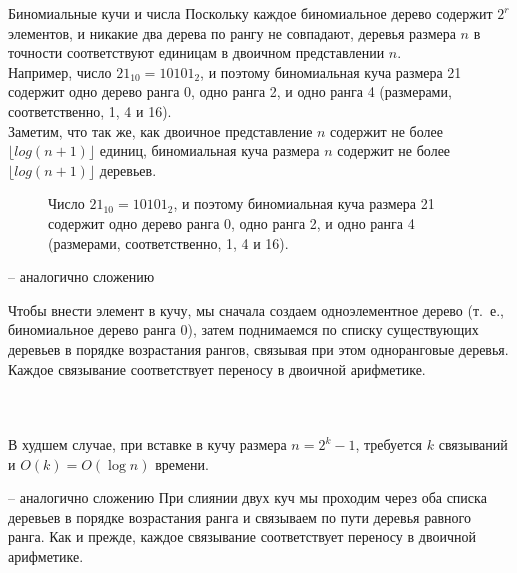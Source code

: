 \begin{frame}[fragile]{Биномиальные кучи и числа}
Поскольку каждое биномиальное дерево содержит $2^r$ элементов, и
никакие два дерева по рангу не совпадают, деревья размера $n$ в
точности соответствуют единицам в двоичном представлении
$n$.\\

Например, число $21_{10} = 10101_2$, и поэтому
биномиальная куча размера 21 содержит одно дерево ранга 0, одно ранга
2, и одно ранга 4 (размерами, соответственно, 1, 4 и 16).\\

Заметим, что
так же, как двоичное представление $n$ содержит не более $\lfloor log
(n+1)\rfloor$ единиц, биномиальная куча размера $n$ содержит не более
$\lfloor log(n+1) \rfloor$ деревьев.
\end{frame}


\begin{frame}[fragile]{}
\begin{figure}[h]
  \centering
  
  \caption{Число $21_{10} = 10101_2$, и поэтому
    биномиальная куча размера 21 содержит одно дерево ранга 0, одно ранга
    2, и одно ранга 4 (размерами, соответственно, 1, 4 и 16).}
\end{figure}

\end{frame}


\begin{frame}[fragile]{ -- аналогично сложению}

Чтобы внести элемент в кучу,
мы сначала создаем одноэлементное дерево (т.~е., биномиальное дерево
ранга 0), затем поднимаемся по списку существующих деревьев в порядке
возрастания рангов, связывая при этом одноранговые деревья. Каждое
связывание соответствует переносу в двоичной арифметике.

\inputminted[firstline=8,lastline=8] {haskell}{code/BinomialHeap.lhs}
\inputminted[firstline=17,lastline=19] {haskell}{code/BinomialHeap.lhs}
\inputminted[firstline=38,lastline=38,gobble=2] {haskell}{code/BinomialHeap.lhs}
В худшем случае, при вставке в кучу размера $n = 2^k -1$, требуется
$k$ связываний и $O(k) = O(\log n)$ времени.
\end{frame}


\begin{frame}[fragile]{ -- аналогично сложению}
При слиянии двух куч мы проходим через оба списка деревьев в порядке
возрастания ранга и связываем по пути деревья равного ранга. Как и
прежде, каждое связывание соответствует переносу в двоичной
арифметике.

\inputminted[firstline=21,lastline=26] {haskell}{code/BinomialHeap.lhs}

\inputminted[firstline=39,lastline=39,gobble=2] {haskell}{code/BinomialHeap.lhs}

\end{frame}

